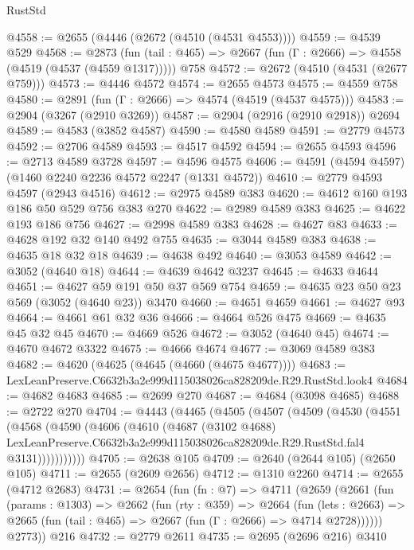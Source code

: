 \begin{lexlean}{RustStd}
\begin{coremodule}
@4558 := @2655 (@4446 (@2672 (@4510 (@4531 @4553))))
@4559 := @4539 @529
@4568 := @2873
    (fun (tail : @465) => @2667 (fun (Γ : @2666) => @4558 (@4519 (@4537 (@4559 @1317)))))
    @758
@4572 := @2672 (@4510 (@4531 (@2677 @759)))
@4573 := @4446 @4572
@4574 := @2655 @4573
@4575 := @4559 @758
@4580 := @2891 (fun (Γ : @2666) => @4574 (@4519 (@4537 @4575)))
@4583 := @2904 (@3267 (@2910 @3269))
@4587 := @2904 (@2916 (@2910 @2918)) @2694
@4589 := @4583 (@3852 @4587)
@4590 := @4580 @4589
@4591 := @2779 @4573
@4592 := @2706 @4589
@4593 := @4517 @4592
@4594 := @2655 @4593
@4596 := @2713 @4589 @3728
@4597 := @4596 @4575
@4606 := @4591 (@4594 @4597) (@1460 @2240 @2236 @4572 @2247 (@1331 @4572))
@4610 := @2779 @4593 @4597 (@2943 @4516)
@4612 := @2975 @4589 @383
@4620 := @4612 @160 @193 @186 @50 @529 @756 @383 @270
@4622 := @2989 @4589 @383
@4625 := @4622 @193 @186 @756
@4627 := @2998 @4589 @383
@4628 := @4627 @83
@4633 := @4628 @192 @32 @140 @492 @755
@4635 := @3044 @4589 @383
@4638 := @4635 @18 @32 @18
@4639 := @4638 @492
@4640 := @3053 @4589
@4642 := @3052 (@4640 @18)
@4644 := @4639 @4642 @3237
@4645 := @4633 @4644
@4651 := @4627 @59 @191 @50 @37 @569 @754
@4659 := @4635 @23 @50 @23 @569 (@3052 (@4640 @23)) @3470
@4660 := @4651 @4659
@4661 := @4627 @93
@4664 := @4661 @61 @32 @36
@4666 := @4664 @526 @475
@4669 := @4635 @45 @32 @45
@4670 := @4669 @526
@4672 := @3052 (@4640 @45)
@4674 := @4670 @4672 @3322
@4675 := @4666 @4674
@4677 := @3069 @4589 @383
@4682 := @4620 (@4625 (@4645 (@4660 (@4675 @4677))))
@4683 := LexLeanPreserve.C6632b3a2e999d115038026ca828209de.R29.RustStd.look4
@4684 := @4682 @4683
@4685 := @2699 @270
@4687 := @4684 (@3098 @4685)
@4688 := @2722 @270
@4704 := @4443
    (@4465
      (@4505
        (@4507
          (@4509
            (@4530
              (@4551
                (@4568
                  (@4590
                    (@4606
                      (@4610
                        (@4687
                          (@3102 @4688)
                          LexLeanPreserve.C6632b3a2e999d115038026ca828209de.R29.RustStd.fal4
                          @3131)))))))))))
@4705 := @2638 @105
@4709 := @2640 (@2644 @105) (@2650 @105)
@4711 := @2655 (@2609 @2656)
@4712 := @1310 @2260
@4714 := @2655 (@4712 @2683)
@4731 := @2654
    (fun (fn : @7) =>
    @4711
      (@2659
        (@2661
          (fun (params : @1303) =>
          @2662
            (fun (rty : @359) =>
            @2664
              (fun (lets : @2663) =>
              @2665 (fun (tail : @465) => @2667 (fun (Γ : @2666) => @4714 @2728))))))
        @2773))
    @216
@4732 := @2779 @2611
@4735 := @2695 (@2696 @216) @3410

\end{coremodule}
\end{lexlean}
